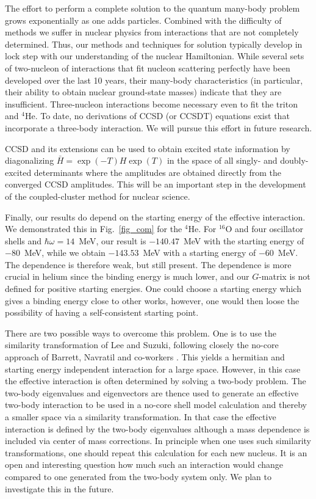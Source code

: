 \documentclass[aps,prc,twocolumn,floatfix]{revtex4}
\begin{document}
The effort to perform a complete solution to 
the quantum many-body problem grows exponentially 
as one adds particles. Combined with the difficulty
of methods we suffer in nuclear physics from interactions that
are not completely determined. Thus, our methods and techniques
for solution typically develop in lock step with our understanding of
the nuclear Hamiltonian. While several sets of two-nucleon 
of interactions that fit nucleon scattering perfectly have been 
developed over the last 10 years, their many-body characteristics
(in particular, their ability to obtain nuclear ground-state masses) 
indicate that they are insufficient. Three-nucleon interactions become
necessary even to fit the triton and $^{4}$He. To date, no derivations of
CCSD (or CCSDT) equations exist that incorporate a three-body interaction. 
We will pursue this effort in future research. 

CCSD and its extensions can be used to obtain excited state information
by diagonalizing $\bar{H}=\exp\left(-T\right)H\exp\left(T\right)$ in
the space of all singly- and doubly-excited determinants where 
the amplitudes are obtained directly from the converged CCSD
amplitudes.  This will be an important step in the development of 
the coupled-cluster method for nuclear science. 

Finally, our results do depend on the starting energy 
of the effective interaction. We demonstrated this in Fig.~\ref{fig_com}
for the $^{4}$He.  For $^{16}$O and four oscillator shells and 
$\hbar\omega=14$~MeV, our result is 
$-140.47$~MeV with the starting energy of $-80$~MeV, while
we obtain $-143.53$~MeV with a starting energy of $-60$~MeV. 
The dependence is therefore weak, but still 
present.  The dependence is more crucial in helium since the binding
energy is much lower, and our $G$-matrix is not defined for positive
starting energies.  One could choose a starting energy 
which gives a binding energy close to other works, however, one would 
then loose the possibility of having a self-consistent starting point.

There are two possible ways to 
overcome this problem. One is to use the similarity transformation
of Lee and Suzuki, following closely the no-core approach of Barrett, 
Navratil and co-workers \cite{bruce1,bruce2,bruce3}.
This yields a hermitian and starting energy independent interaction 
for a large space. However, in this case
the effective interaction
 is often determined by solving a two-body problem. The two-body
 eigenvalues and eigenvectors are thence used to generate an effective
 two-body interaction to be used in a no-core shell model calculation
 and thereby a smaller space via a similarity transformation. 
In that case the effective interaction is defined by the
 two-body eigenvalues although a mass dependence is included via 
center of mass corrections. 
In principle when one uses such similarity transformations, one should
repeat this calculation for each new nucleus. 
It is an open and interesting question how 
much such an interaction would change compared to one generated from the
two-body system only.
We plan to investigate this in the future.
\end{document}
